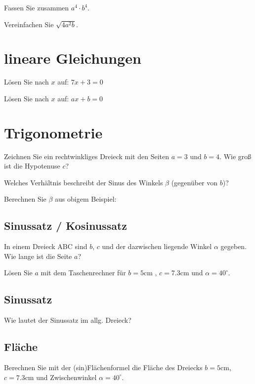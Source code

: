 Fassen Sie zusammen $a^4 \cdot{} b^4$. 

Vereinfachen Sie $\sqrt{4a^2b}$. 

\section{lineare Gleichungen}
Lösen Sie nach $x$ auf: $7x+3=0$ 

Lösen Sie nach $x$ auf: $ax + b = 0$ 

\section{Trigonometrie}
Zeichnen Sie ein rechtwinkliges Dreieck mit den Seiten $a=3$ und $b=4$.
Wie groß ist die Hypotenuse $c$? 

Welches Verhältnis beschreibt der Sinus des Winkels $\beta$ (gegenüber von $b$)?

Berechnen Sie $\beta$ aus obigem Beispiel: 


\subsection{Sinussatz / Kosinussatz}
In einem Dreieck ABC sind $b$, $c$ und der dazwischen liegende Winkel $\alpha$ gegeben. Wie lange ist die Seite $a$?

Lösen Sie $a$ mit dem Taschenrechner für $b=5$cm , $c=7.3$cm und $\alpha=40^{\circ{}}$. 

\subsection{Sinussatz}
Wie lautet der Sinussatz im allg. Dreieck?

\subsection{Fläche}
Berechnen Sie mit der (sin)Flächenformel die Fläche des Dreiecks $b = 5$cm, $c=7.3$cm und Zwischenwinkel $\alpha{} = 40^{\circ{}}$. 

